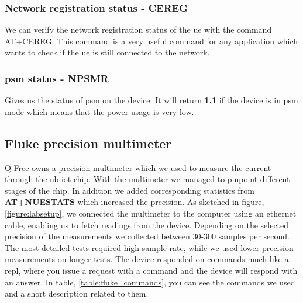 \documentclass[USenglish]{ifimaster}  %
\begin{document}
\subsubsection{Network registration status - CEREG}
We can verify the network registration status of the \acrshort{ue} with the command AT+CEREG. This command is a very useful command for any application which wants to check if the \acrshort{ue} is still connected to the network.

\subsubsection{\acrshort{psm} status - NPSMR}
Gives us the status of \acrshort{psm} on the device. It will return \textbf{1,1} if the device is in \acrshort{psm} mode which means that the power usage is very low.

\subsection{Fluke precision multimeter}
Q-Free owns a precision multimeter which we used to measure the current through the \acrshort{nb-iot} chip. With the multimeter we managed to pinpoint different stages of the chip. In addition we added corresponding statistics from \textbf{AT+NUESTATS} which increased the precision. As sketched in figure, \vref{figure:labsetup}, we connected the multimeter to the computer using an ethernet cable, enabling us to fetch readings from the device.
Depending on the selected precision of the measurements we collected between 30-300 samples per second. The most detailed tests required high sample rate, while we used lower precision measurements on longer tests. The device responded on commands much like a \acrfull{repl}, where you issue a request with a command and the device will respond with an answer. In table, \vref{table:fluke_commands}, you can see the commands we used and a short description related to them.

\begin{table}[H]
\centering
{}
\caption{Fluke commands}
\label{table:fluke_commands}
\end{table}
\end{document}
